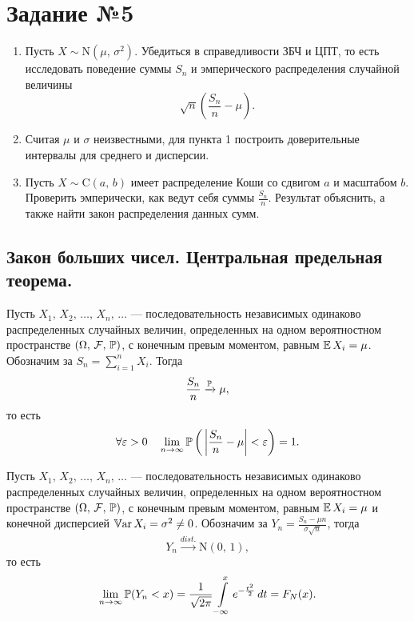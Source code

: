 \section{Задание №5}

\begin{enumerate}
        \item Пусть $X \sim \mbox{N}(\mu,\,\sigma^2)$. Убедиться в справедливости ЗБЧ и ЦПТ, то есть исследовать поведение суммы $S_n$ и эмперического распределения случайной величины
$$
        \sqrt{n}
        \left(
                \frac{S_n}{n} - \mu
        \right).
$$
        \item Считая $\mu$ и $\sigma$ неизвестными, для пункта 1 построить доверительные интервалы для среднего и дисперсии.
        \item Пусть $X \sim \mbox{C}(a,\,b)$ имеет распределение Коши со сдвигом $a$ и масштабом $b$. Проверить эмперически, как ведут себя суммы $\frac{S_n}{n}$. Результат объяснить, а также найти закон распределения данных сумм.
\end{enumerate}


\subsection{Закон больших чисел. Центральная предельная теорема.}

\begin{theorem}
        Пусть $X_1,\,X_2,\,\ldots,\,X_n,\,\ldots$ ---  последовательность независимых одинаково распределенных случайных величин, определенных на одном вероятностном пространстве $(\Omega,\, \mathcal{F},\, \mathbb{P})$, с конечным превым моментом, равным $\mathbb{E}\,X_i = \mu$. Обозначим за $S_n = \sum_{i = 1}^{n} X_i$. Тогда
$$
        \frac{S_n}{n} \xrightarrow{\mathbb{P}} \mu,
$$
то есть
$$
        \forall \varepsilon > 0
        \quad
        \lim\limits_{n\to\infty}
        \mathbb{P}\left(\,
        \left|
                \frac{S_n}{n} - \mu
        \right|
        < \varepsilon
        \right)
        = 1.
$$
\end{theorem}

\begin{theorem} 
        Пусть $X_1,\,X_2,\,\ldots,\,X_n,\,\ldots$ ---  последовательность независимых одинаково распределенных случайных величин, определенных на одном вероятностном пространстве $(\Omega,\, \mathcal{F},\, \mathbb{P})$, с конечным превым моментом, равным $\mathbb{E}\,X_i = \mu$ и конечной дисперсией $\mathbb{V}\mbox{ar}\,X_i = \sigma^2 \neq 0$. Обозначим за $Y_n = \frac{S_n - \mu n}{\sigma \sqrt{n}}$, тогда
$$
        Y_n \xrightarrow{dist.} \mbox{N}(0,\,1),
$$
то есть
$$
        \lim\limits_{n\to\infty}\mathbb{P}(Y_n < x) =
        \frac{1}{\sqrt{2\pi}}\int\limits_{-\infty}^{x} e^{-\frac{t^2}{2}}\,dt
        = F_N(x).
$$
\end{theorem}


